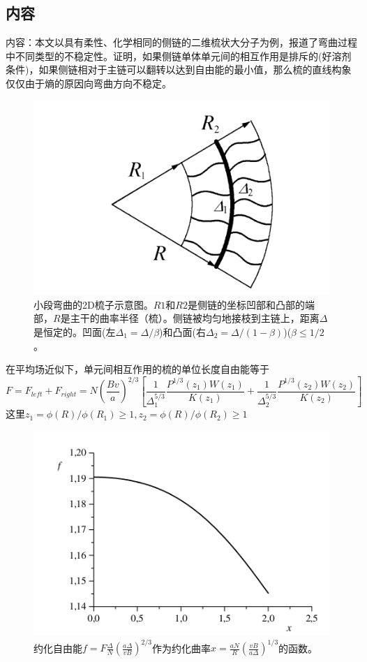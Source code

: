 \documentclass[12pt,a4paper]{article}
\numberwithin{equation}{section}
\begin{document}
\subsection{内容}
内容：本文以具有柔性、化学相同的侧链的二维梳状大分子为例，报道了弯曲过程中不同类型的不稳定性。证明，如果侧链单体单元间的相互作用是排斥的(好溶剂条件)，如果侧链相对于主链可以翻转以达到自由能的最小值，那么梳的直线构象仅仅由于熵的原因向弯曲方向不稳定。
\begin{figure}[H]
\centering
\includegraphics[scale=0.5]{./figures/2.png}
\caption{小段弯曲的2D梳子示意图。$R1$和$R2$是侧链的坐标凹部和凸部的端部，$R$是主干的曲率半径（梳）。侧链被均匀地接枝到主链上，距离$\Delta$是恒定的。凹面(左$\Delta_1=\Delta /\beta$)和凸面(右$\Delta_2=\Delta/(1-\beta)$)($\beta \leq 1/2$。}
\end{figure}
在平均场近似下，单元间相互作用的梳的单位长度自由能等于
\begin{equation}
F=F_{left}+F_{right}=N\left( \frac{Bv}{a} \right)^{2/3}\left[ \frac{1}{\Delta _1^{5/3}}\frac{P^{1/3}(z_1)W(z_1)}{K(z_1)}+\frac{1}{\Delta_2^{5/3}}\frac{P^{1/3}(z_2)W(z_2)}{K(z_2)} \right]
\end{equation}
这里$z_1=\phi(R)/\phi(R_1)\geq 1,z_2=\phi(R)/\phi(R_2)\geq 1$
\begin{figure}[H]
\centering
\includegraphics[scale=0.5]{./figures/12.png}
\caption{约化自由能$f=F\frac{\Delta}{N}\left( \frac{a\Delta}{vB} \right)^{2/3}$作为约化曲率$x=\frac{aN}{R}\left( \frac{vB}{a\Delta} \right)^{1/3}$的函数。}
\end{figure}
\end{document}
